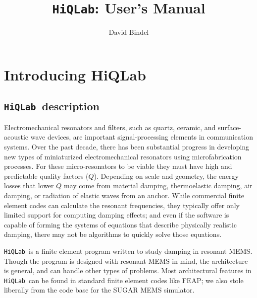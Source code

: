 \documentclass{article}
\newcommand{\hiq}{\texttt{HiQLab}}
\begin{document}
\title{\hiq: User's Manual}
\author{David Bindel}

\maketitle
\tableofcontents
\newpage


\section{Introducing HiQLab}

\subsection{\hiq\ description}

Electromechanical resonators and filters, such as quartz, ceramic, and
surface-acoustic wave devices, are important signal-processing
elements in communication systems.  Over the past decade, there has
been substantial progress in developing new types of miniaturized
electromechanical resonators using microfabrication processes.  For
these micro-resonators to be viable they must have high and
predictable quality factors ($Q$).  Depending on scale and geometry,
the energy losses that lower $Q$ may come from material damping,
thermoelastic damping, air damping, or radiation of elastic waves from
an anchor.  While commercial finite element codes can calculate the
resonant frequencies, they typically offer only limited support for
computing damping effects; and even if the software is capable of
forming the systems of equations that describe physically realistic
damping, there may not be algorithms to quickly solve those equations.

\hiq\ is a finite element program written to study damping in resonant
MEMS.  Though the program is designed with resonant MEMS in mind, the
architecture is general, and can handle other types of problems.  Most
architectural features in \hiq\ can be found in standard finite
element codes like FEAP; we also stole liberally from the code base
for the SUGAR MEMS simulator.
\end{document}
